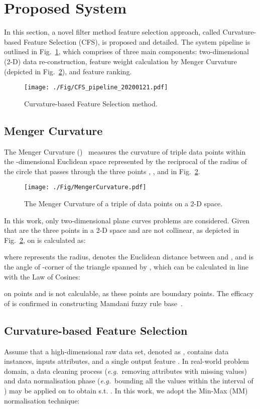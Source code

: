 \documentclass{article}
\newcommand{\zzeg}{\emph{e.g.}~}
\newcommand*{\1}{\textcolor{red}}
\begin{document}
\section{Proposed System} \label{sec:appr}
In this section, a novel filter method feature selection approach, called Curvature-based Feature Selection (CFS), is proposed and detailed. The system pipeline is outlined in Fig.~\ref{fig:pip}, which comprises of three main components: two-dimensional (2-D) data re-construction, feature weight calculation by Menger Curvature (depicted in Fig.~\ref{fig:mengercurvature}), and feature ranking.

\begin{figure}[!htbp]
	\centering
	\texttt{[image: ./Fig/CFS\_pipeline\_20200121.pdf]}
	\caption{Curvature-based Feature Selection method.}\label{fig:pip}
\end{figure}

\subsection{Menger Curvature}\label{sec:RoC}
The Menger Curvature ()~\cite{leger1999menger} measures the curvature of triple data points within the -dimensional Euclidean space  represented by the reciprocal of the radius of the circle that passes through the three points , , and  in Fig.~\ref{fig:mengercurvature}.

\begin{figure}[!htbp]
	\centering
	\texttt{[image: ./Fig/MengerCurvature.pdf]}
	\caption{The Menger Curvature of a triple of data points on a 2-D space.}\label{fig:mengercurvature}
\end{figure}

In this work, only two-dimensional plane curves problems are considered. Given that  are the three points in a 2-D space  and  are not collinear, as depicted in Fig.~\ref{fig:mengercurvature},  on  is calculated as:


where  represents the radius,  denotes the Euclidean distance between  and , and   is the angle of -corner of the triangle spanned by , which can be calculated in line with the Law of Cosines:

 on points  and  is not calculable, as these points are boundary points. The efficacy of  is confirmed in constructing Mamdani fuzzy rule base~\cite{zuo2020CSRBG}.

\subsection{Curvature-based Feature Selection}\label{sec:CFS}
Assume that a high-dimensional raw data set, denoted as , contains  data instances,  inputs attributes, and a single output feature . In real-world problem domain, a data cleaning process (\zzeg removing attributes with missing values) and data normalisation phase (\zzeg bounding all the values within the interval of ) may be applied on  to obtain  s.t. . In this work, we adopt the Min-Max (MM) normalisation technique:
\end{document}
